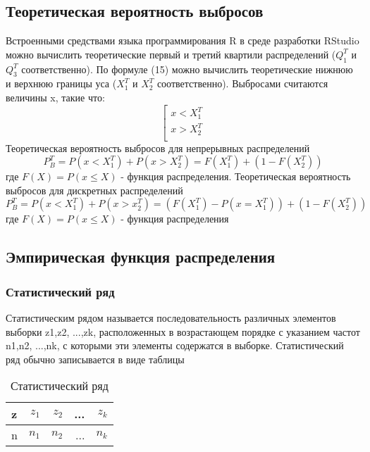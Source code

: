 \subsection{Теоретическая вероятность выбросов}
Встроенными средствами языка программирования R в среде разработки RStudio можно вычислить теоретические первый и третий квартили распределений ($Q_1^T$ и $Q_3^T$ соответственно). По формуле (15) можно вычислить теоретические нижнюю и верхнюю границы уса ($X_1^T$ и $X_2^T$ соответственно). Выбросами считаются величины x, такие что: 
\begin{equation}
\left[
\begin{gathered}
x < X_1^T \\
x > X_2^T \\
\end{gathered}
\right.
\end{equation}
Теоретическая вероятность выбросов для непрерывных распределений
\begin{equation}
P_B^T = P(x<X_1^T) + P(x>X_2^T)=F(X_1^T) + (1-F(X_2^T))
\end{equation}
где $F(X)=P(x\leq{X})$ - функция распределения.
Теоретическая вероятность выбросов для дискретных распределений
\begin{equation}
P_B^T = P(x<X_1^T)+P(x>x_2^T)=(F(X_1^T)-P(x=X_1^T))+(1-F(X_2^T))
\end{equation}
где $F(X) = P(x\leq{X})$ - функция распределения

\subsection{Эмпирическая функция распределения}
	\subsubsection{Статистический ряд}
	Статистическим рядом называется последовательность различных элементов выборки z1,z2, ...,zk, расположенных в возрастающем порядке с указанием частот n1,n2, ...,nk, с которыми эти элементы содержатся в выборке. Статистический ряд обычно записывается в виде таблицы
	\begin{table}[H]
		\centering
		\begin{tabular}[t]{lrrrr}
			\hline
			z   &      $z_1$ & $z_2$ & ... & $z_k$ 		\\
			\hline
			n & $n_1$ & $n_2$ & ... & $n_k$   	\\
			\hline
		\end{tabular}
		\caption{Статистический ряд}
		\label{tab:normal}
	\end{table}

